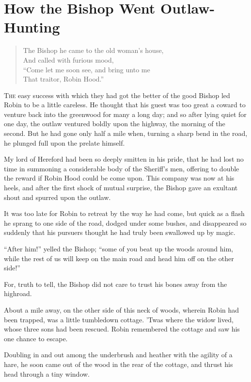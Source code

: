 \chapter{How the Bishop Went Outlaw-Hunting}

\begin{quote}
The Bishop he came to the old woman's house,\\
And called with furious mood,\\
``Come let me soon see, and bring unto me\\
That traitor, Robin Hood.''
\end{quote}

\lettrine{T}{he} easy success with which they had got the better of the
good Bishop led Robin to be a little careless. He thought that his guest
was too great a coward to venture back into the greenwood for many a
long day; and so after lying quiet for one day, the outlaw ventured
boldly upon the highway, the morning of the second. But he had gone only
half a mile when, turning a sharp bend in the road, he plunged full upon
the prelate himself.

My lord of Hereford had been so deeply smitten in his pride, that he had
lost no time in summoning a considerable body of the Sheriff's men,
offering to double the reward if Robin Hood could be come upon. This
company was now at his heels, and after the first shock of mutual
surprise, the Bishop gave an exultant shout and spurred upon the outlaw.

It was too late for Robin to retreat by the way he had come, but quick
as a flash he sprang to one side of the road, dodged under some bushes,
and disappeared so suddenly that his pursuers thought he had truly been
swallowed up by magic.

``After him!'' yelled the Bishop; ``some of you beat up the woods around
him, while the rest of us will keep on the main road and head him off on
the other side!''

For, truth to tell, the Bishop did not care to trust his bones away from
the highroad.

About a mile away, on the other side of this neck of woods, wherein
Robin had been trapped, was a little tumbledown cottage. 'Twas where the
widow lived, whose three sons had been rescued. Robin remembered the
cottage and saw his one chance to escape.

Doubling in and out among the underbrush and heather with the agility of
a hare, he soon came out of the wood in the rear of the cottage, and
thrust his head through a tiny window.

